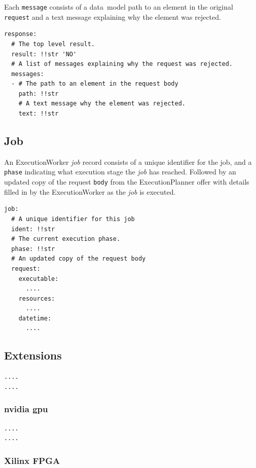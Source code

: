 \documentclass[11pt,a4paper]{ivoa}
\newcommand{\datamodel} {data~model}
\newcommand{\execplanner} {ExecutionPlanner}
\newcommand{\execworker} {ExecutionWorker}
\newcommand{\codeword}[1] {\texttt{#1}}
\newcommand{\workerjob} {\textit{job}}
\begin{document}
Each \codeword{message} consists of a \datamodel{} path to an element in the original
\codeword{request} and a text message explaining why the element was rejected.

\begin{lstlisting}[]
response:
  # The top level result.
  result: !!str 'NO'
  # A list of messages explaining why the request was rejected.
  messages:
  - # The path to an element in the request body
    path: !!str
    # A text message why the element was rejected.
    text: !!str
\end{lstlisting}

\subsection{Job}
\label{datamodel-job}

An \execworker{} \workerjob{} record consists of a unique identifier for the job,
and a \codeword{phase} indicating what execution stage the \workerjob{} has reached.
Followed by an updated copy of the request \codeword{body} from the \execplanner{}
offer with details filled in by the \execworker{} as the \workerjob{} is executed.

\begin{lstlisting}[]
job:
  # A unique identifier for this job
  ident: !!str
  # The current execution phase.
  phase: !!str
  # An updated copy of the request body
  request:
    executable:
      ....
    resources:
      ....
    datetime:
      ....
\end{lstlisting}

\subsection{Extensions}
\label{datamodel-extensions}

\begin{lstlisting}[]
....
....
\end{lstlisting}

\subsubsection{nvidia gpu}
\label{datamodel-nvidia-gpu}

\begin{lstlisting}[]
....
....
\end{lstlisting}

\subsubsection{Xilinx FPGA}
\label{datamodel-xilinx-fpga}
\end{document}
